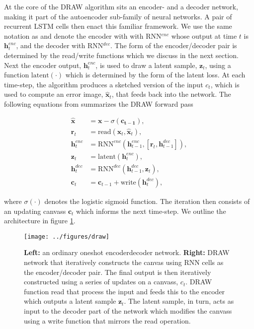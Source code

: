 \noindent At the core of the DRAW algorithm sits an encoder- and a decoder network, making it part of the autoencoder sub-family of neural networks. A pair of recurrent LSTM cells then enact this familiar framework. We use the same notation as \citet{Gregor2015} and denote the encoder with with RNN${}^{enc}$ whose output at time $t$ is $\mathbf{h}_t^{enc}$, and the decoder with RNN${}^{dec}$. The form of the encoder/decoder pair is determined by the read/write functions which we discuss in the next section. Next the encoder output, $\mathbf{h}_t^{enc}$, is used to draw a latent sample, $\mathbf{z}_t$, using a function $\text{latent}(\cdot)$ which is determined by the form of the latent loss. At each time-step, the algorithm produces a sketched version of the input $c_t$, which is used to compute an error image, $\hat{\mathbf{x}}_t$, that feeds back into the network. The following equations from \citet{Gregor2015} summarizes the DRAW forward pass

\begin{align}
\hat{\mathbf{x}} &= \mathbf{x} - \sigma(\mathbf{c_{t-1}}), \\
\mathbf{r}_t &= \text{read}(\mathbf{x}_t, \hat{\mathbf{x}}_t ), \\
\mathbf{h}^{enc}_t &= \text{RNN}^{enc}( \mathbf{h}^{enc}_{t-1}, [\mathbf{r}_t, \mathbf{h}^{dec}_{t-1}]),\\
\mathbf{z}_t &= \text{latent}(\mathbf{h}^{enc}_t),\\
\mathbf{h}^{dec}_t &= \text{RNN}^{dec}( \mathbf{h}^{dec}_{t-1}, \mathbf{z}_t),\\
\mathbf{c}_t &= \mathbf{c}_{t-1} + \text{write}(\mathbf{h}_t^{dec}) \label{eq:draw},
\end{align} 

 \noindent where $\sigma(\cdot)$ denotes the logistic sigmoid function. The iteration then consists of an updating canvass $\mathbf{c}_t$ which informs the next time-step. We outline the architecture in figure \ref{fig:draw}.

\begin{figure}[h]
\centering
\texttt{[image: ../figures/draw]}
\caption[DRAW network architecture]{\textbf{Left:} an ordinary one\-shot encoder\-decoder network. \textbf{Right:} DRAW network that iteratively constructs the canvas using RNN cells as the encoder/decoder pair. The final output is then iteratively constructed using a series of updates on a canvass, $c_t$. DRAW function read that process the input and feeds this to the encoder which outputs a latent sample $\mathbf{z}_t$. The latent sample, in turn, acts as input to the decoder part of the network which modifies the canvass using a write function that mirrors the read operation.}\label{fig:draw}
\end{figure}
 
